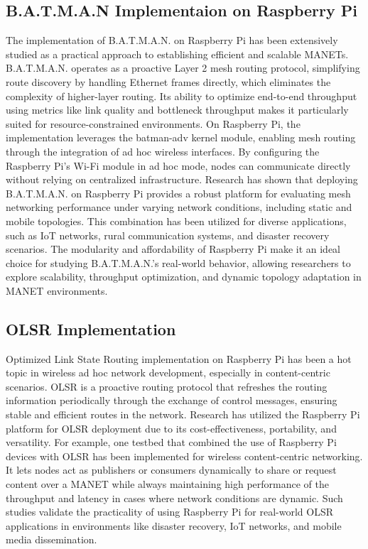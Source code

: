 \documentclass[]{nsm-thesis}
\begin{document}
\subsection{B.A.T.M.A.N Implementaion on Raspberry Pi}
The implementation of B.A.T.M.A.N. on Raspberry Pi has been extensively studied as a practical approach to establishing efficient and scalable MANETs. B.A.T.M.A.N. operates as a proactive Layer 2 mesh routing protocol, simplifying route discovery by handling Ethernet frames directly, which eliminates the complexity of higher-layer routing. Its ability to optimize end-to-end throughput using metrics like link quality and bottleneck throughput makes it particularly suited for resource-constrained environments. On Raspberry Pi, the implementation leverages the batman-adv kernel module, enabling mesh routing through the integration of ad hoc wireless interfaces. By configuring the Raspberry Pi's Wi-Fi module in ad hoc mode, nodes can communicate directly without relying on centralized infrastructure. Research has shown that deploying B.A.T.M.A.N. on Raspberry Pi provides a robust platform for evaluating mesh networking performance under varying network conditions, including static and mobile topologies. This combination has been utilized for diverse applications, such as IoT networks, rural communication systems, and disaster recovery scenarios. The modularity and affordability of Raspberry Pi make it an ideal choice for studying B.A.T.M.A.N.’s real-world behavior, allowing researchers to explore scalability, throughput optimization, and dynamic topology adaptation in MANET environments.\cite{10639789}
\subsection{OLSR Implementation}
Optimized Link State Routing implementation on Raspberry Pi has been a hot topic in wireless ad hoc network development, especially in content-centric scenarios. OLSR is a proactive routing protocol that refreshes the routing information periodically through the exchange of control messages, ensuring stable and efficient routes in the network. Research has utilized the Raspberry Pi platform for OLSR deployment due to its cost-effectiveness, portability, and versatility. For example, one testbed that combined the use of Raspberry Pi devices with OLSR has been implemented for wireless content-centric networking. It lets nodes act as publishers or consumers dynamically to share or request content over a MANET while always maintaining high performance of the throughput and latency in cases where network conditions are dynamic. Such studies validate the practicality of using Raspberry Pi for real-world OLSR applications in environments like disaster recovery, IoT networks, and mobile media dissemination.\cite{7424834}
\end{document}
